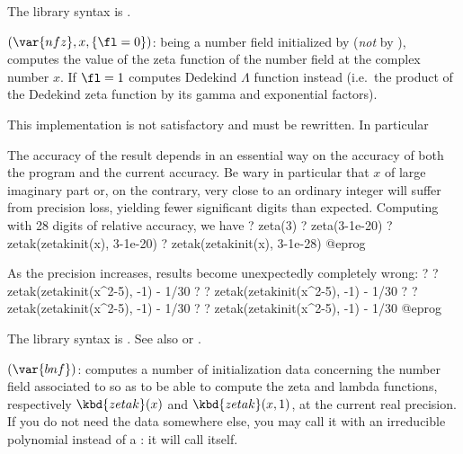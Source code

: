 The library syntax is .

$(\var{nfz},x,\{\fl=0\})$: \label{se:zetak} being a number
field initialized by  (\emph{not} by ),
computes the value of the  zeta function of the number
field at the complex number $x$. If $\fl=1$ computes Dedekind $\Lambda$
function instead (i.e.~the product of the Dedekind zeta function by its gamma
and exponential factors).

 This implementation is not satisfactory and must be
rewritten. In particular

\item The accuracy of the result depends in an essential way on the
accuracy of both the  program and the current accuracy.
Be wary in particular that $x$ of large imaginary part or, on the
contrary, very close to an ordinary integer will suffer from precision
loss, yielding fewer significant digits than expected. Computing with 28
digits of relative accuracy, we have
\bprog
? zeta(3)
? zeta(3-1e-20)
? zetak(zetakinit(x), 3-1e-20)
? zetak(zetakinit(x), 3-1e-28)
@eprog

\item As the precision increases, results become unexpectedly
completely wrong:
\bprog
? 
? zetak(zetakinit(x^2-5), -1) - 1/30
? 
? zetak(zetakinit(x^2-5), -1) - 1/30
? 
? zetak(zetakinit(x^2-5), -1) - 1/30
? 
? zetak(zetakinit(x^2-5), -1) - 1/30
@eprog

The library syntax is .
See also  or
.

$(\var{bnf})$: \label{se:zetakinit}computes a number of initialization data
concerning the number field associated to  so as to be able
to compute the  zeta and lambda functions, respectively
$\kbd{zetak}(x)$ and $\kbd{zetak}(x,1)$, at the current real precision. If
you do not need the  data somewhere else, you may call it
with an irreducible polynomial instead of a : it will call
 itself.

